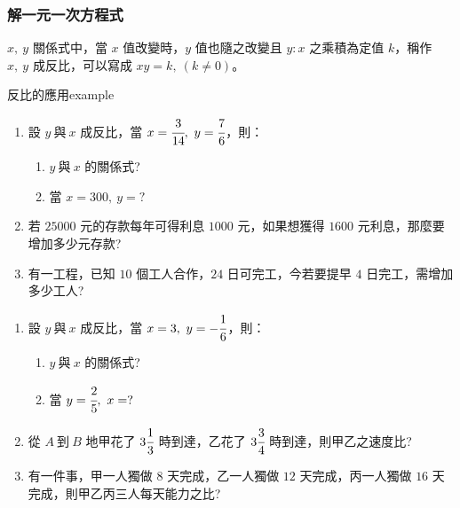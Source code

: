 \documentclass[bwprint,a4paper]{extarticle}
\begin{document}
\subsubsection{解一元一次方程式}
{\hspace{0.5cm}$x,\ y$ 關係式中，當 $x$ 值改變時，$y$ 值也隨之改變且 $y:x$ 之乘積為定值 $k$，稱作 $x,\ y$ 成反比，可以寫成 $xy=k,\ (k\neq0)$。
}
\newpage
\begin{question}{反比的應用}{example}
	\begin{enumerate}
		\item 設 $y\ \text{與}\ x$ 成反比，當 $x=\cfrac3{14},\ y=\cfrac76$，則：
		\begin{enumerate}[label=(\arabic*)]
			\item $y\ \text{與}\ x$ 的關係式?
			\item 當 $x=300,\ y=?$
		\end{enumerate}
		\item 若 $25000$ 元的存款每年可得利息 $1000$ 元，如果想獲得 $1600$ 元利息，那麼要增加多少元存款?
		\item 有一工程，已知 $10$ 個工人合作，$24$ 日可完工，今若要提早 $4$ 日完工，需增加多少工人?
	\end{enumerate}	
\end{question}
\vspace{30ex}
\begin{observing}
	\begin{enumerate}
		\item 設 $y\ \text{與}\ x$ 成反比，當 $x=3,\ y=-\cfrac16$，則：
		\begin{enumerate}[label=(\arabic*)]
			\item $y\ \text{與}\ x$ 的關係式?
			\item 當 $y=\cfrac25,\ x=?$
		\end{enumerate}
		\item 從 $A\ \text{到}\ B$ 地甲花了 $3\cfrac13$ 時到達，乙花了 $3\cfrac34$ 時到達，則甲乙之速度比?
		\item 有一件事，甲一人獨做 $8$ 天完成，乙一人獨做 $12$ 天完成，丙一人獨做 $16$ 天完成，則甲乙丙三人每天能力之比?
	\end{enumerate}	
\end{observing}
\newpage
\end{document}
